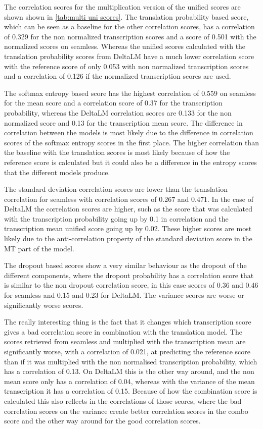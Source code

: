 The correlation scores for the multiplication version of the unified scores are shown shown in \autoref{tab:multi uni scores}. The translation probability based score, which can be seen as a baseline for the other correlation scores, has a correlation of 0.329 for the non normalized transcription scores and a score of 0.501 with the normalized scores on seamless. Whereas the unified scores calculated with the translation probability scores from DeltaLM have a much lower correlation score with the reference score of only 0.053 with non normalized transcription scores and a correlation of 0.126 if the normalized transcription scores are used. 

The softmax entropy based score has the highest correlation of 0.559 on seamless for the mean score and a correlation score of 0.37 for the transcription probability, whereas the DeltaLM correlation scores are 0.133 for the non normalized score and 0.13 for the transcription mean score. The difference in correlation between the models is most likely due to the difference in correlation scores of the softmax entropy scores in the first place. The higher correlation than the baseline with the translation scores is most likely because of how the reference score is calculated but it could also be a difference in the entropy scores that the different models produce.

The standard deviation correlation scores are lower than the translation correlation for seamless with correlation scores of 0.267 and 0.471. In the case of DeltaLM the correlation scores are higher, such as the score that was calculated with the transcription probability going up by 0.1 in correlation and the transcription mean unified score going up by 0.02. These higher scores are most likely due to the anti-correlation property of the standard deviation score in the MT part of the model. 

The dropout based scores show a very similar behaviour as the dropout of the different components, where the dropout probability has a correlation score that is similar to the non dropout correlation score, in this case scores of 0.36 and 0.46 for seamless and 0.15 and 0.23 for DeltaLM. 
The variance scores are worse or significantly worse scores. 

The really interesting thing is the fact that it changes which transcription score gives a bad correlation score in combination with the translation model. 
The scores retrieved from seamless and multiplied with the transcription mean are significantly worse, with a correlation of 0.021, at predicting the reference score than if it was multiplied with the non normalised transcription probability, which has a correlation of 0.13. On DeltaLM this is the other way around, and the non mean score only has a correlation of 0.04, whereas with the variance of the mean transcription it has a correlation of 0.15. Because of how the combination score is calculated this also reflects in the correlations of those scores, where the bad correlation scores on the variance create better correlation scores in the combo score and the other way around for the good correlation scores.


